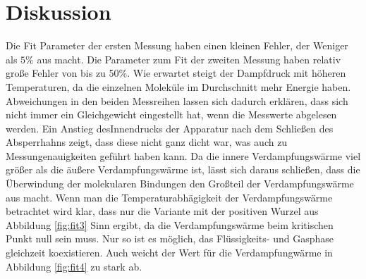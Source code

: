 \section{Diskussion}
\label{sec:Diskussion}
Die Fit Parameter der ersten Messung haben einen kleinen Fehler, der Weniger als
$5\%$ aus macht. Die Parameter zum Fit der zweiten Messung haben relativ
große Fehler von bis zu 50\%. Wie erwartet steigt der Dampfdruck mit
höheren Temperaturen, da die einzelnen Moleküle im Durchschnitt mehr
Energie haben. Abweichungen in den beiden Messreihen lassen sich dadurch erklären,
dass sich nicht immer ein Gleichgewicht eingestellt hat, wenn die Messwerte
abgelesen werden. Ein Anstieg desInnendrucks der Apparatur nach dem Schließen des
Absperrhahns zeigt, dass diese nicht ganz dicht war, was auch zu Messungenauigkeiten
geführt haben kann. Da die innere Verdampfungswärme viel größer als die äußere
Verdampfungswärme ist, lässt sich daraus schließen, dass die Überwindung der molekularen
Bindungen den Großteil der Verdampfungswärme aus macht. Wenn man die
Temperaturabhägigkeit der Verdampfungswärme betrachtet wird klar, dass nur die
Variante mit der positiven Wurzel aus
Abbildung \ref{fig:fit3} Sinn ergibt, da die Verdampfungswärme beim kritischen
Punkt null sein muss.  Nur so ist es möglich, das Flüssigkeits- und Gasphase
gleichzeit koexistieren. Auch weicht der Wert für die Verdampfungwärme in
Abbildung \ref{fig:fit4} zu stark ab.

